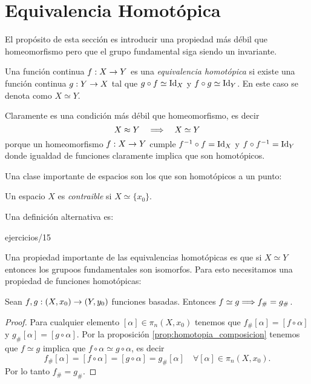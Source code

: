 \documentclass[../../topologia_algebraica]{subfiles}
\begin{document}
\section{Equivalencia Homot\'opica}

El prop\'osito de esta secci\'on es introducir una propiedad m\'as d\'ebil que homeomorfismo
pero que el grupo fundamental siga siendo un invariante.

\begin{defin}
	Una funci\'on continua $f:X\rightarrow Y$ es una \emph{equivalencia homot\'opica} si existe una
	funci\'on continua $g:Y\rightarrow X$ tal que $g\circ f\simeq\text{Id}_X$ y $f\circ g\simeq\text{Id}_Y$. En
	este caso se denota como $X\simeq Y$.
\end{defin}

Claramente es una condici\'on m\'as d\'ebil que homeomorfismo, es decir
\[
	X\approx Y \quad\Longrightarrow\quad X\simeq Y
\]
porque un homeomorfismo $f:X\rightarrow Y$ cumple $f^{-1}\circ f=\text{Id}_X$ y $f\circ f^{-1}=\text{Id}_Y$
donde igualdad de funciones claramente implica que son homot\'opicos.

Una clase importante de espacios son los que son homot\'opicos a un punto:

\begin{defin}
	Un espacio $X$ es \emph{contraible} si $X\simeq\{x_0\}$.
\end{defin}

Una definici\'on alternativa es:

{ejercicios/15} %

Una propiedad importante de las equivalencias homot\'opicas es que si $X\simeq Y$ entonces los
grupoos fundamentales son isomorfos. Para esto necesitamos una propiedad de funciones homot\'opicas:

\begin{prop}
	Sean $f,g:(X,x_0)\rightarrow(Y,y_0)$ funciones basadas. Entonces $f\simeq g \Longrightarrow f_{\#}=g_{\#}$.
\end{prop}
\begin{proof}
	Para cualquier elemento $[\alpha]\in\pi_n(X,x_0)$ tenemos que $f_{\#}[\alpha]=[f\circ\alpha]$
	y $g_{\#}[\alpha]=[g\circ\alpha]$. Por la proposici\'on \ref{prop:homotopia_composicion} tenemos
	que $f\simeq g$ implica que $f\circ\alpha\simeq g\circ\alpha$, es decir
	\[
		f_{\#}[\alpha]=[f\circ\alpha]=[g\circ\alpha]=g_{\#}[\alpha]
		\quad \forall[\alpha]\in\pi_n(X,x_0).
	\]
	Por lo tanto $f_{\#}=g_{\#}$.
\end{proof}
\end{document}
